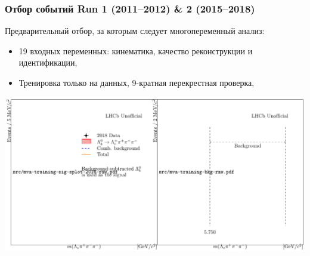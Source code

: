 \documentclass[10pt]{beamer}
\begin{document}
\begin{frame}[label=mva-approach]%
  \frametitle{Отбор событий Run 1 (2011--2012) \& 2 (2015--2018)}

  Предварительный отбор, за которым следует многопеременный анализ:
  \begin{itemize}
    \item 19 входных переменных: кинематика, качество реконструкции 
      и идентификации,
    \item Тренировка только на данных, 9-кратная перекрестная проверка,
  \end{itemize}

  \vfill \centering
  \includegraphics[width=.9\linewidth]{figures/mva-training-sig-bkg}
\end{frame}%
\end{document}
